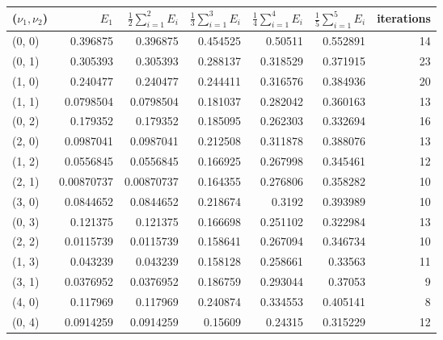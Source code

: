 \documentclass[12pt]{article}
\begin{document}
\begin{table}
\centering
\begin{tabular}{||l|rrrrr|r||}
\hline \hline
    ($\nu_1, \nu_2$)  &  $E_1$ & $\displaystyle\frac{1}{2} \sum_{i=1}^2 E_i $ &  $\displaystyle\frac{1}{3} \sum_{i=1}^3 E_i $  &  $\displaystyle\frac{1}{4} \sum_{i=1}^4 E_i $  &   $\displaystyle\frac{1}{5} \sum_{i=1}^5 E_i $  &   iterations \\
\hline \hline
 (0, 0) & 0.396875   &        0.396875   &       0.454525 &       0.50511  &       0.552891 &           14 \\ \hline
 (0, 1) & 0.305393   &        0.305393   &       0.288137 &       0.318529 &       0.371915 &           23 \\
 (1, 0) & 0.240477   &        0.240477   &       0.244411 &       0.316576 &       0.384936 &           20 \\ \hline
 (1, 1) & 0.0798504  &        0.0798504  &       0.181037 &       0.282042 &       0.360163 &           13 \\
 (0, 2) & 0.179352   &        0.179352   &       0.185095 &       0.262303 &       0.332694 &           16 \\
 (2, 0) & 0.0987041  &        0.0987041  &       0.212508 &       0.311878 &       0.388076 &           13 \\ \hline
 (1, 2) & 0.0556845  &        0.0556845  &       0.166925 &       0.267998 &       0.345461 &           12 \\
 (2, 1) & 0.00870737 &        0.00870737 &       0.164355 &       0.276806 &       0.358282 &           10 \\
 (3, 0) & 0.0844652  &        0.0844652  &       0.218674 &       0.3192   &       0.393989 &           10 \\
 (0, 3) & 0.121375   &        0.121375   &       0.166698 &       0.251102 &       0.322984 &           13 \\ \hline
 (2, 2) & 0.0115739  &        0.0115739  &       0.158641 &       0.267094 &       0.346734 &           10 \\
 (1, 3) & 0.043239   &        0.043239   &       0.158128 &       0.258661 &       0.33563  &           11 \\
 (3, 1) & 0.0376952  &        0.0376952  &       0.186759 &       0.293044 &       0.37053  &            9 \\
 (4, 0) & 0.117969   &        0.117969   &       0.240874 &       0.334553 &       0.405141 &            8 \\
 (0, 4) & 0.0914259  &        0.0914259  &       0.15609  &       0.24315  &       0.315229 &           12 \\ \hline
\hline
\end{tabular}
\end{table}
 
\end{document}
